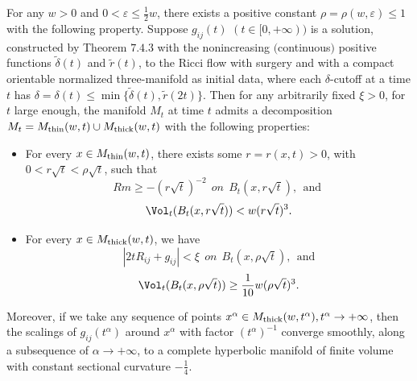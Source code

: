 \begin{theorem}
  \label{thm:cz-surgery-thick-thin-decomposition}

For any $w>0$ and $0 < \varepsilon \leq \frac{1}{2}w$, there
exists a positive constant $\rho = \rho(w,\varepsilon) \leq 1$
with the following property. Suppose $g_{ij}(t)$ $(t \in
[0,+\infty))$ is a solution, constructed by Theorem $7.4.3$ with
the nonincreasing $($continuous$)$ positive functions
$\widetilde{\delta}(t)$ and $\widetilde{r}(t)$, to the Ricci flow
with surgery and with a compact orientable normalized
three-manifold as initial data, where each $\delta$-cutoff at a
time $t$ has $\delta=\delta(t) \leq \min
\{\widetilde{\delta}(t),\widetilde{r}(2t)\}$. Then for any
arbitrarily fixed $\xi >0$, for $t$ large enough, the manifold
$M_t$ at time $t$ admits a decomposition $M_t=M_{\rm
thin}(w,t)\cup M_{\rm thick}(w,t)$ with the following properties:
\begin{itemize}
\item[(a)] For every $x\in M_{\rm thin}(w,t)$, there exists some
$r=r(x,t)>0$, with $0<r\sqrt{t}<\rho\sqrt{t}$, such that
$$
Rm\geq -(r\sqrt{t})^{-2} \ \ on \ \ B_t(x,r\sqrt{t}), \ \
\mbox{and }
$$
$$
\Vol_t(B_t(x,r\sqrt{t}))<w(r\sqrt{t})^3.
$$
\item[(b)] For every $x\in M_{\rm thick}(w,t)$, we have
$$
|2tR_{ij}+g_{ij}|<\xi\ \ on \ \ B_t(x,\rho\sqrt{t}), \ \ \mbox{and
}
$$
$$
\Vol_t(B_t(x,\rho\sqrt{t}))\geq \frac{1}{10}w(\rho\sqrt{t})^3.
$$
\end{itemize}
Moreover, if we take any sequence of points $x^{\alpha}\in M_{\rm
thick}(w,t^{\alpha}),t^{\alpha}\rightarrow+\infty$, then the
scalings of $g_{ij}(t^{\alpha})$ around $x^{\alpha}$ with factor
$(t^{\alpha})^{-1}$ converge smoothly, along a subsequence of
$\alpha\rightarrow+\infty$, to a complete hyperbolic manifold of
finite volume with constant sectional curvature $-\frac{1}{4}$.
\end{theorem}
